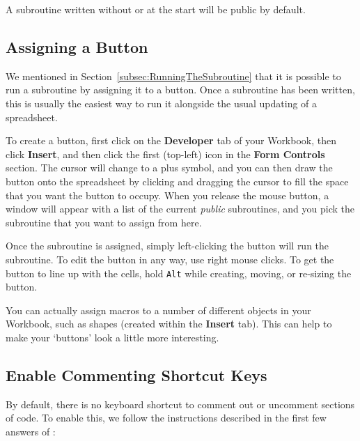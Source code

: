 \documentclass[11pt]{article}%
\begin{document}
A subroutine written without  or  at the start will be public by default.


\subsection{Assigning a Button}\label{subsec:AssigningAButton}

We mentioned in Section~\ref{subsec:RunningTheSubroutine} that it is possible to run a subroutine by assigning it to a button. Once a subroutine has been written, this is usually the easiest way to run it alongside the usual updating of a spreadsheet.

To create a button, first click on the \textbf{Developer} tab of your Workbook, then click \textbf{Insert}, and then click the first (top-left) icon in the \textbf{Form Controls} section. The cursor will change to a plus symbol, and you can then draw the button onto the spreadsheet by clicking and dragging the cursor to fill the space that you want the button to occupy. When you release the mouse button, a window will appear with a list of the current \textit{public} subroutines, and you pick the subroutine that you want to assign from here.

Once the subroutine is assigned, simply left-clicking the button will run the subroutine. To edit the button in any way, use right mouse clicks. To get the button to line up with the cells, hold \texttt{Alt} while creating, moving, or re-sizing the button.

You can actually assign macros to a number of different objects in your Workbook, such as shapes (created within the \textbf{Insert} tab). This can help to make your `buttons' look a little more interesting.


\subsection{Enable Commenting Shortcut Keys}

By default, there is no keyboard shortcut to comment out or uncomment sections of code. To enable this, we follow the instructions described in the first few answers of \cite{CommentUncommentCode}:
\end{document}
